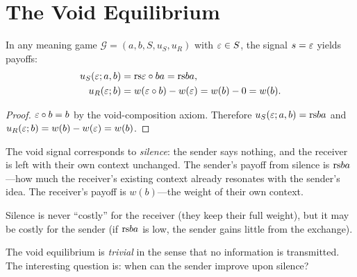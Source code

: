 \section{The Void Equilibrium}

\begin{theorem}
\label{thm:void-equilibrium}
In any meaning game $\mathcal{G} = (a, b, S, u_S, u_R)$ with $\varepsilon \in S$,
the signal $s = \varepsilon$ yields payoffs:
\begin{align}
  u_S(\varepsilon; a, b) &= \mathrm{rs}{\varepsilon \circ b}{a} = \mathrm{rs}{b}{a}, \\
  u_R(\varepsilon; b) &= w(\varepsilon \circ b) - w(\varepsilon) = w(b) - 0 = w(b).
\end{align}
\end{theorem}

\begin{proof}
$\varepsilon \circ b = b$ by the void-composition axiom.
Therefore $u_S(\varepsilon; a, b) = \mathrm{rs}{b}{a}$ and
$u_R(\varepsilon; b) = w(b) - w(\varepsilon) = w(b)$.
\end{proof}

\begin{interpretation}
The void signal corresponds to \emph{silence}: the sender says nothing, and
the receiver is left with their own context unchanged.  The sender's payoff
from silence is $\mathrm{rs}{b}{a}$---how much the receiver's existing context
already resonates with the sender's idea.  The receiver's payoff is
$w(b)$---the weight of their own context.

Silence is never ``costly'' for the receiver (they keep their full weight),
but it may be costly for the sender (if $\mathrm{rs}{b}{a}$ is low, the sender
gains little from the exchange).

The void equilibrium is \emph{trivial} in the sense that no information is
transmitted.  The interesting question is: when can the sender improve upon
silence?
\end{interpretation}

